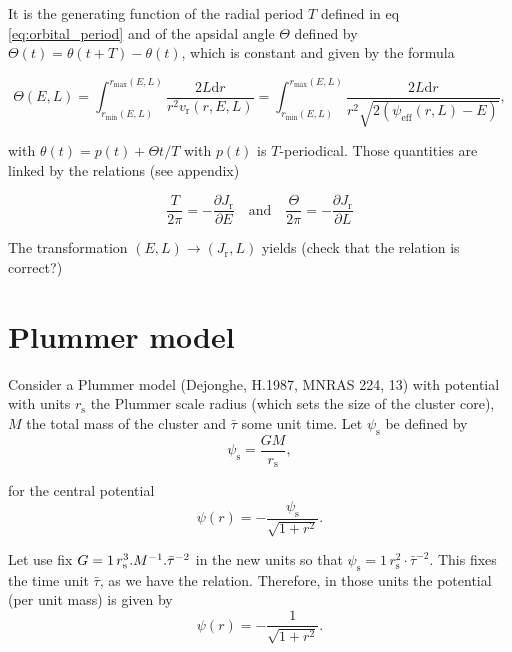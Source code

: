 \documentclass[11pt]{article}
\newcommand{\rs}{\mathrm{s}}
\newcommand{\rr}{\mathrm{r}}
\newcommand{\psis}{\psi_{\rs}}
\newcommand{\vr}{v_{\rr}}
\newcommand{\rd}{{\mathrm{d}}}
\newcommand{\rmax}{r_{\max}}
\newcommand{\rmin}{r_{\min}}
\newcommand{\psieff}{\psi_{\mathrm{eff}}}
\newcommand{\Jr}{J_{\mathrm{r}}}
\begin{document}
It is the generating function of the radial period $T$ defined in eq \eqref{eq:orbital_period} and of the apsidal angle $\Theta$ defined by  $\Theta(t)=\theta(t+T)-\theta(t)$, which is constant and given by the formula

\begin{equation}
  \Theta(E,L)=   \int_{\rmin(E,L)}^{\rmax(E,L)} \frac{2 L \rd r}{r^{2}\vr(r,E,L)} =   \int_{\rmin(E,L)}^{\rmax(E,L)} \frac{2 L \rd r}{r^{2}\sqrt{2(\psieff(r,L)-E)}}, 
  \label{eq:Apsidal_angle}
\end{equation}

with $\theta(t) = p(t) + \Theta t/T$ with $p(t)$ is $T$-periodical.
Those quantities are linked by the relations  (see appendix)

\begin{equation}
  \frac{T}{2\pi} = -\frac{\partial \Jr}{\partial E}\quad \mathrm{and} \quad
  \frac{\Theta}{2\pi} = -\frac{\partial \Jr}{\partial L}
  \label{eq:dJr}
\end{equation}

The transformation $(E,L) \rightarrow (\Jr,L)$ yields (check that the relation is correct?)

\section{Plummer model}
\label{sec:Plummer}

  Consider a Plummer model (Dejonghe, H.1987, MNRAS 224, 13) with potential
with units $r_{\rs}$ the Plummer scale radius (which sets the size
of the cluster core), $M$ the total mass of the cluster and $\bar{\tau}$
some unit time. Let $\psis$ be defined by
\begin{equation}
\psis = \frac{G M}{r_{\rs}} ,
\label{eq:def_psi_s}
\end{equation}

for the central potential
\begin{equation}
\psi(r)=-\frac{\psis}{\sqrt{1+r^{2}}} .
\label{eq:def_potential}
\end{equation}

Let use fix $G=1\,r_{\rs}^{3}.M^{-1}.{\rm \bar{\tau}^{-2}}$ in the
new units so that $\psis=1\,r_{\rs}^{2}\cdot\bar{\tau}^{-2}$. This
fixes the time unit $\bar{\tau}$, as we have the relation. Therefore, in
those units the potential (per unit mass) is given by
\begin{equation}
\psi(r)=-\frac{1}{\sqrt{1+r^{2}}} .
\label{eq:def_potential_new_units}
\end{equation}
\end{document}
